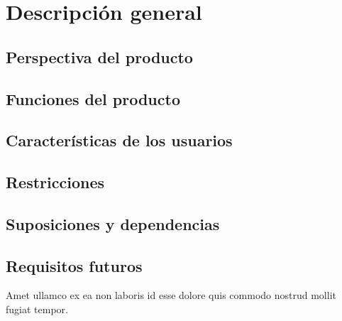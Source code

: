 \section{Descripción general}
\subsection{Perspectiva del producto}
\subsection{Funciones del producto}
\subsection{Características de los usuarios}
\subsection{Restricciones}
\subsection{Suposiciones y dependencias}
\subsection{Requisitos futuros}
Amet ullamco ex ea non laboris id esse dolore quis commodo nostrud mollit fugiat tempor.